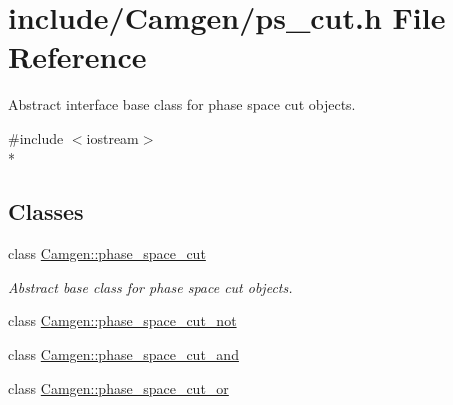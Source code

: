\hypertarget{a00741}{}\section{include/\+Camgen/ps\+\_\+cut.h File Reference}
\label{a00741}


Abstract interface base class for phase space cut objects.  


{\ttfamily \#include $<$iostream$>$}\\*
\subsection*{Classes}
\begin{DoxyCompactItemize}
\item 
class \hyperlink{a00419}{Camgen\+::phase\+\_\+space\+\_\+cut}
\begin{DoxyCompactList}\small\item\em Abstract base class for phase space cut objects. \end{DoxyCompactList}\item 
class \hyperlink{a00421}{Camgen\+::phase\+\_\+space\+\_\+cut\+\_\+not}
\item 
class \hyperlink{a00420}{Camgen\+::phase\+\_\+space\+\_\+cut\+\_\+and}
\item 
class \hyperlink{a00422}{Camgen\+::phase\+\_\+space\+\_\+cut\+\_\+or}
\end{DoxyCompactItemize}

